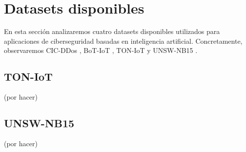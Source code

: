 \section{Datasets disponibles}

En esta sección analizaremos cuatro datasets disponibles utilizados para aplicaciones de ciberseguridad basadas en inteligencia artificial. Concretamente, observaremos CIC-DDos \cite{8888419}, BoT-IoT \cite{DBLP:journals/corr/abs-1811-00701} \cite{10.1007/978-3-319-90775-8_3} \cite{KORONIOTIS202091} \cite{DBLP:journals/corr/abs-2005-00722} \cite{9252856} \cite{phdbotiot}, TON-IoT \cite{MOUSTAFA2021102994} \cite{9444348} \cite{9189760} \cite{9343133} \cite{9343084} \cite{moustafa2019systemic} \cite{ASHRAF2021103041} y UNSW-NB15 \cite{7348942} \cite{doi:10.1080/19393555.2015.1125974} \cite{7948715} \cite{Moustafa2017} \cite{10.1007/978-3-030-72802-1_9}.





\subsection{TON-IoT}

(por hacer)

\subsection{UNSW-NB15}

(por hacer)
